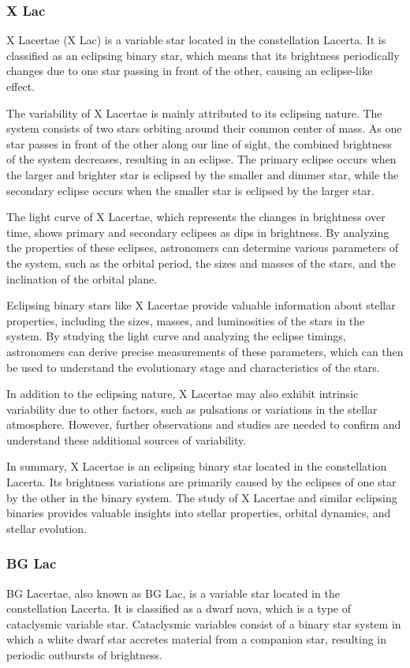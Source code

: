 \subsubsection*{ X Lac }
X Lacertae (X Lac) is a variable star located in the constellation Lacerta. It is classified as an eclipsing binary star, which means that its brightness periodically changes due to one star passing in front of the other, causing an eclipse-like effect.

The variability of X Lacertae is mainly attributed to its eclipsing nature. The system consists of two stars orbiting around their common center of mass. As one star passes in front of the other along our line of sight, the combined brightness of the system decreases, resulting in an eclipse. The primary eclipse occurs when the larger and brighter star is eclipsed by the smaller and dimmer star, while the secondary eclipse occurs when the smaller star is eclipsed by the larger star.

The light curve of X Lacertae, which represents the changes in brightness over time, shows primary and secondary eclipses as dips in brightness. By analyzing the properties of these eclipses, astronomers can determine various parameters of the system, such as the orbital period, the sizes and masses of the stars, and the inclination of the orbital plane.

Eclipsing binary stars like X Lacertae provide valuable information about stellar properties, including the sizes, masses, and luminosities of the stars in the system. By studying the light curve and analyzing the eclipse timings, astronomers can derive precise measurements of these parameters, which can then be used to understand the evolutionary stage and characteristics of the stars.

In addition to the eclipsing nature, X Lacertae may also exhibit intrinsic variability due to other factors, such as pulsations or variations in the stellar atmosphere. However, further observations and studies are needed to confirm and understand these additional sources of variability.

In summary, X Lacertae is an eclipsing binary star located in the constellation Lacerta. Its brightness variations are primarily caused by the eclipses of one star by the other in the binary system. The study of X Lacertae and similar eclipsing binaries provides valuable insights into stellar properties, orbital dynamics, and stellar evolution.

\subsubsection*{ BG Lac }
BG Lacertae, also known as BG Lac, is a variable star located in the constellation Lacerta. It is classified as a dwarf nova, which is a type of cataclysmic variable star. Cataclysmic variables consist of a binary star system in which a white dwarf star accretes material from a companion star, resulting in periodic outbursts of brightness.

